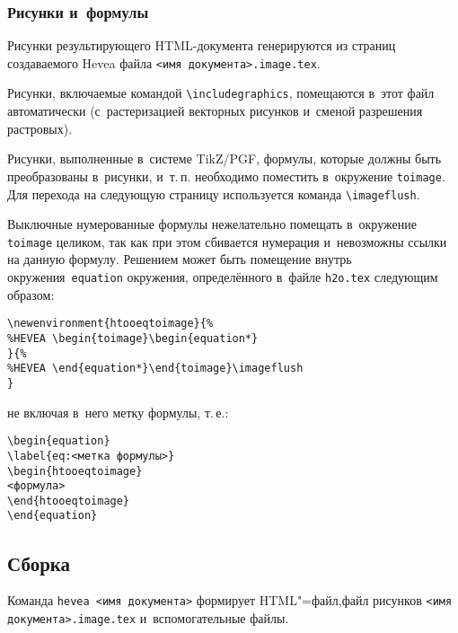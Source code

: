 \documentclass[10pt, a5paper]{article}
\begin{document}
\subsubsection*{Рисунки и~формулы}
Рисунки результирующего HTML-документа генерируются из страниц создаваемого Hevea файла \verb!<имя документа>.image.tex!.

Рисунки, включаемые командой \verb!\includegraphics!, помещаются в~этот файл автоматически (с~растеризацией векторных рисунков и~сменой разрешения растровых).

Рисунки, выполненные в~системе TikZ/PGF, формулы, которые должны быть преобразованы в~рисунки, и~т.\,п. необходимо поместить в~окружение \verb!toimage!. Для перехода на следующую страницу используется команда \verb!\imageflush!.

Выключные нумерованные формулы нежелательно помещать в~окружение \verb!toimage! целиком, так как при этом сбивается нумерация и~невозможны ссылки на данную формулу.
Решением может быть помещение внутрь окружения~\verb!equation! окружения, определённого в~файле \verb!h2o.tex! следующим образом:
\begin{verbatim}
\newenvironment{htooeqtoimage}{%
%HEVEA \begin{toimage}\begin{equation*}
}{%
%HEVEA \end{equation*}\end{toimage}\imageflush
}
\end{verbatim}%
не включая в~него метку формулы, т.\,е.:
\begin{verbatim}
\begin{equation}
\label{eq:<метка формулы>}
\begin{htooeqtoimage}
<формула>
\end{htooeqtoimage}
\end{equation}
\end{verbatim}

% 


\subsection*{Сборка}
Команда \verb!hevea <имя документа>! формирует HTML"=файл,\linebreak файл рисунков \texttt{<имя документа>.image.tex} и~вспомогательные \linebreak файлы. 
\end{document}
